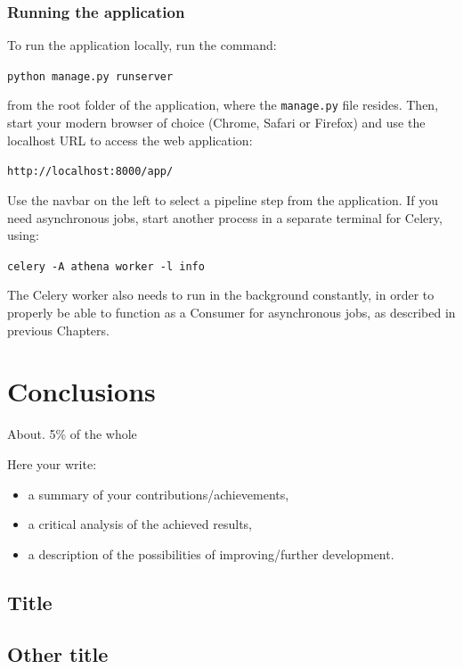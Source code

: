 \documentclass[12pt,a4paper,twoside]{report}
\begin{document}
\subsection*{Running the application}
To run the application locally, run the command:

\texttt{python manage.py runserver}

from the root folder of the application, where the \texttt{manage.py} file resides. Then, start your modern browser of choice (Chrome, Safari or Firefox) and use the localhost URL to access the web application:

\texttt{http://localhost:8000/app/}

Use the navbar on the left to select a pipeline step from the application. If you need asynchronous jobs, start another process in a separate terminal for Celery, using:

\texttt{celery -A athena worker -l info}

The Celery worker also needs to run in the background constantly, in order to properly be able to function as a Consumer for asynchronous jobs, as described in previous Chapters.

\chapter{Conclusions}

About. 5\% of the whole

Here your write:
\begin{itemize}
\item a summary of your contributions/achievements,
\item a critical analysis of the achieved results,
\item a description of the possibilities of improving/further development.
\end{itemize}
\section{Title}
\section{Other title}


 


\end{document}
